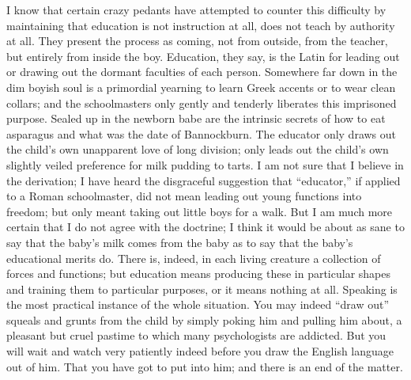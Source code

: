 \documentclass{book}
\begin{document}
I know that certain crazy pedants have attempted to counter this difficulty by maintaining that education is not instruction at all, does not teach by authority at all. They present the process as coming, not from outside, from the teacher, but entirely from inside the boy. Education, they say, is the Latin for leading out or drawing out the dormant faculties of each person. Somewhere far down in the dim boyish soul is a primordial yearning to learn Greek accents or to wear clean collars; and the schoolmasters only gently and tenderly liberates this imprisoned purpose. Sealed up in the newborn babe are the intrinsic secrets of how to eat asparagus and what was the date of Bannockburn. The educator only draws out the child’s own unapparent love of long division; only leads out the child’s own slightly veiled preference for milk pudding to tarts. I am not sure that I believe in the derivation; I have heard the disgraceful suggestion that “educator,” if applied to a Roman schoolmaster, did not mean leading out young functions into freedom; but only meant taking out little boys for a walk. But I am much more certain that I do not agree with the doctrine; I think it would be about as sane to say that the baby’s milk comes from the baby as to say that the baby’s educational merits do. There is, indeed, in each living creature a collection of forces and functions; but education means producing these in particular shapes and training them to particular purposes, or it means nothing at all. Speaking is the most practical instance of the whole situation. You may indeed “draw out” squeals and grunts from the child by simply poking him and pulling him about, a pleasant but cruel pastime to which many psychologists are addicted. But you will wait and watch very patiently indeed before you draw the English language out of him. That you have got to put into him; and there is an end of the matter.
\end{document}
